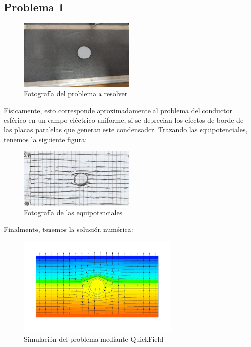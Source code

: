 \documentclass[a4paper,12pt]{article}
\begin{document}
\subsection{Problema 1}


\begin{figure}[h!]
\centering
	\caption{Fotografía del problema a resolver}
	\includegraphics[width=0.5\textwidth]{Prob1pic.jpeg}
\end{figure}
Físicamente, esto corresponde aproximadamente al problema del conductor esférico en un campo eléctrico uniforme, si se deprecian los efectos de borde de las placas paralelas que generan este condensador. Trazando las equipotenciales, tenemos la siguiente figura:
\begin{figure}[h!]
\centering
	\caption{Fotografía de las equipotenciales}
	\includegraphics[width=0.5\textwidth]{problem1equi.jpg}
\end{figure}

Finalmente, tenemos la solución numérica:

\begin{figure}[h!]
\centering
	\caption{Simulación del problema mediante QuickField}
	\includegraphics[width=0.7\textwidth]{test1.jpg}
\end{figure}
\end{document}
